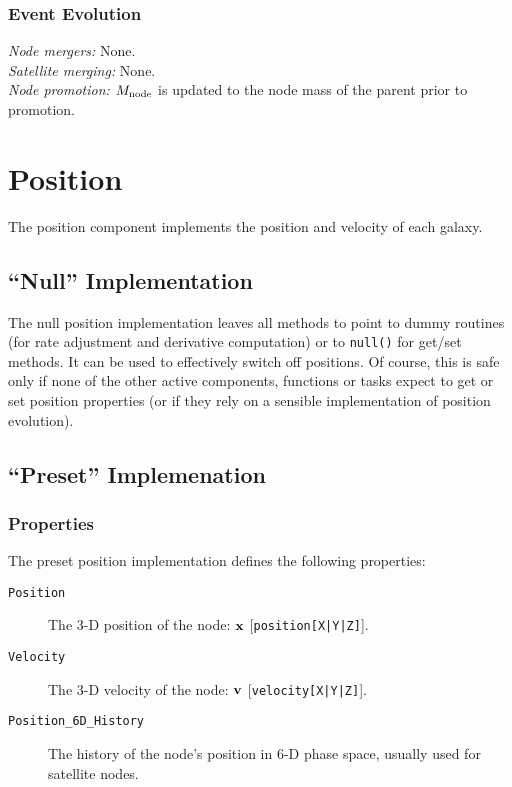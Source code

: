 \subsubsection{Event Evolution}

\noindent\emph{Node mergers:} None.\\

\noindent\emph{Satellite merging:} None.\\

\noindent\emph{Node promotion:} $M_{\rm node}$ is updated to the node mass of the parent prior to promotion.\\

\section{Position}\label{sec:ComponentPosition}

The position component implements the position and velocity of each galaxy.

\subsection{``Null'' Implementation}

The null position implementation leaves all methods to point to dummy routines (for rate adjustment and derivative computation) or to {\tt null()} for get/set methods. It can be used to effectively switch off positions. Of course, this is safe only if none of the other active components, functions or tasks expect to get or set position properties (or if they rely on a sensible implementation of position evolution).

\subsection{``Preset'' Implemenation}

\subsubsection{Properties}

The preset position implementation defines the following properties:
\begin{description}
 \item [{\tt Position}] The 3-D position of the node: ${\bf x}$ [{\tt position[X|Y|Z]}].
 \item [{\tt Velocity}] The 3-D velocity of the node: ${\bf v}$ [{\tt velocity[X|Y|Z]}].
 \item [{\tt Position\_6D\_History}] The history of the node's position in 6-D phase space, usually used for satellite nodes.
\end{description}

